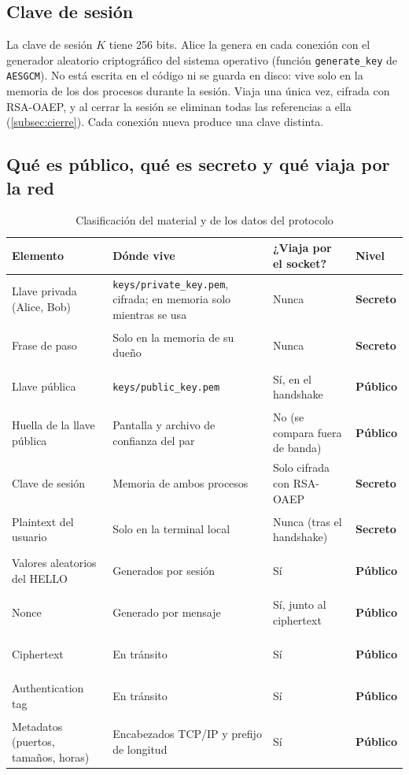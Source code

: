 \documentclass[11pt,a4paper]{article}
\theoremstyle{definition}
\theoremstyle{remark}
\newcommand{\code}[1]{\texttt{#1}}
\newcommand{\nivel}[2]{\colorbox{#1}{\strut\footnotesize\textbf{#2}}}
\newcommand{\publico}{\nivel{nivelpublico}{P\'ublico}}
\newcommand{\secreto}{\nivel{nivelsecreto}{Secreto}}
\begin{document}
\subsection{Clave de sesión}
\label{subsec:clavesesion}

La clave de sesión $K$ tiene 256 bits. Alice la genera en cada conexión
con el generador aleatorio criptográfico del sistema operativo (función
\code{generate\_key} de \code{AESGCM}). No está escrita en el código ni se
guarda en disco: vive solo en la memoria de los dos procesos durante la
sesión. Viaja una única vez, cifrada con RSA-OAEP, y al cerrar la sesión se
eliminan todas las referencias a ella (\cref{subsec:cierre}). Cada conexión
nueva produce una clave distinta.

\subsection{Qué es público, qué es secreto y qué viaja por la red}
\label{subsec:clasificacion}

\begin{table}[H]
  \centering
  \caption{Clasificación del material y de los datos del protocolo}
  \label{tab:clasificacion}
  \small
  \begin{tabularx}{\linewidth}{@{}P{3.6cm} Y P{2.7cm} l@{}}
    \toprule
    \textbf{Elemento} & \textbf{Dónde vive} & \textbf{¿Viaja por el socket?} & \textbf{Nivel} \\
    \midrule
    Llave privada (Alice, Bob) & \code{keys/private\_key.pem}, cifrada; en memoria solo mientras se usa & Nunca & \secreto \\
    Frase de paso              & Solo en la memoria de su dueño & Nunca & \secreto \\
    Llave pública              & \code{keys/public\_key.pem} & Sí, en el handshake & \publico \\
    Huella de la llave pública & Pantalla y archivo de confianza del par & No (se compara fuera de banda) & \publico \\
    Clave de sesión            & Memoria de ambos procesos & Solo cifrada con RSA-OAEP & \secreto \\
    Plaintext del usuario      & Solo en la terminal local & Nunca (tras el handshake) & \secreto \\
    Valores aleatorios del HELLO & Generados por sesión & Sí & \publico \\
    Nonce                      & Generado por mensaje & Sí, junto al ciphertext & \publico \\
    Ciphertext                 & En tránsito & Sí & \publico \\
    Authentication tag         & En tránsito & Sí & \publico \\
    Metadatos (puertos, tamaños, horas) & Encabezados TCP/IP y prefijo de longitud & Sí & \publico \\
    \bottomrule
  \end{tabularx}
\end{table}
\end{document}
